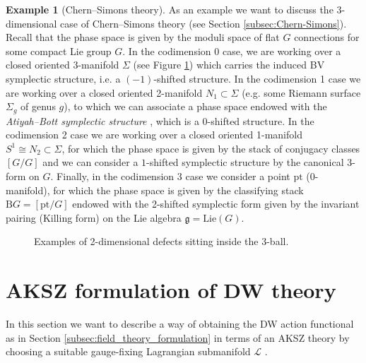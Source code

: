 \documentclass[11pt,colorinlistoftodos]{amsart}
\numberwithin{equation}{subsection}
\theoremstyle{plain}
\theoremstyle{definition}
\newtheorem{ex}[thm]{Example}
\theoremstyle{remark}
\newcommand{\calL}{\mathcal{L}}
\begin{document}
\begin{ex}[Chern--Simons theory]
As an example we want to discuss the 3-dimensional case of Chern--Simons theory (see Section \ref{subsec:Chern-Simons}). Recall that the phase space is given by the moduli space of flat $G$ connections for some compact Lie group $G$. In the codimension 0 case, we are working over a closed oriented 3-manifold $\Sigma$ (see Figure \ref{fig:3-ball_defects}) which carries the induced BV symplectic structure, i.e. a $(-1)$-shifted structure. In the codimension 1 case we are working over a closed oriented 2-manifold $N_1\subset \Sigma$ (e.g. some Riemann surface $\Sigma_g$ of genus $g$), to which we can associate a phase space endowed with the \emph{Atiyah--Bott symplectic structure} \cite{AtiyahBott1983}, which is a 0-shifted structure. In the codimension 2 case we are working over a closed oriented 1-manifold $S^1\cong N_2\subset \Sigma$, for which the phase space is given by the stack of conjugacy classes $[G/G]$ and we can consider a $1$-shifted symplectic structure by the canonical 3-form on $G$. Finally, in the codimension 3 case we consider a point $\mathrm{pt}$ (0-manifold), for which the phase space is given by the classifying stack $\mathrm{B}G=[\mathrm{pt}/G]$ endowed with the 2-shifted symplectic form given by the invariant pairing (Killing form) on the Lie algebra $\mathfrak{g}=\mathrm{Lie}(G)$.
\begin{figure}[h!]
    \centering
    \caption{Examples of 2-dimensional defects sitting inside the 3-ball.}
    \label{fig:3-ball_defects}
\end{figure}
\end{ex}



\section{AKSZ formulation of DW theory}
\label{sec:AKSZ_formulation_of_DW_theory}
In this section we want to describe a way of obtaining the DW action functional as in Section \ref{subsec:field_theory_formulation} in terms of an AKSZ theory by choosing a suitable gauge-fixing Lagrangian submanifold $\calL$ \cite{BaulieuSinger1989,Ikeda2011,CattZabz2019}. 
\end{document}
